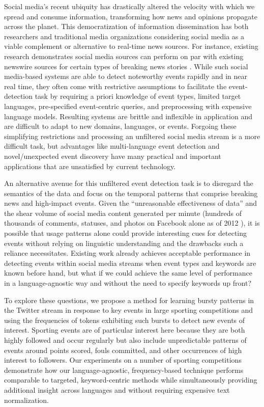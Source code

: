 \documentclass{acm_proc_article-sp}
\begin{document}
Social media's recent ubiquity has drastically altered the velocity with which we spread and consume information, transforming how news and opinions propagate across the planet. 
This democratization of information dissemination has both researchers and traditional media organizations considering social media as a viable complement or alternative to real-time news sources.
For instance, existing research demonstrates social media sources can perform on par with existing newswire sources for certain types of breaking news stories \cite{petrovic2013can}.
While such social media-based systems are able to detect noteworthy events rapidly and in near real time, they often come with restrictive assumptions to facilitate the event-detection task by requiring a priori knowledge of event types, limited target languages, pre-specified event-centric queries, and preprocessing with expensive language models.
Resulting systems are brittle and inflexible in application and are difficult to adapt to new domains, languages, or events.
Forgoing these simplifying restrictions and processing an unfiltered social media stream is a more difficult task, but advantages like multi-language event detection and novel/unexpected event discovery have many practical and important applications that are unsatisfied by current technology.

An alternative avenue for this unfiltered event detection task is to disregard the semantics of the data and focus on the temporal patterns that comprise breaking news and high-impact events.
Given the ``unreasonable effectiveness of data'' and the shear volume of social media content  generated per minute (hundreds of thousands of comments, statuses, and photos on Facebook alone as of 2012 \cite{Pring2012}), it is possible that usage patterns alone could provide interesting cues for detecting events without relying on linguistic understanding and the drawbacks such a reliance necessitates.
Existing work already achieves acceptable performance in detecting events within social media streams when event types and keywords are known before hand, but what if we could achieve the same level of performance in a language-agnostic way and without the need to specify keywords up front?

To explore these questions, we propose a method for learning bursty patterns in the Twitter stream in response to key events in large sporting competitions and using the frequencies of tokens exhibiting such bursts to detect new events of interest.
Sporting events are of particular interest here because they are both highly followed and occur regularly but also include unpredictable patterns of events around points scored, fouls committed, and other occurrences of high interest to followers.
Our experiments on a number of sporting competitions demonstrate how our language-agnostic, frequency-based technique performs comparable to targeted, keyword-centric methods while simultaneously providing additional insight across languages and without requiring expensive text normalization.
\end{document}
